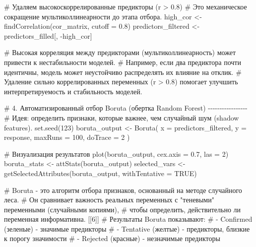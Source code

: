 \documentclass[
  letterpaper,
  DIV=11,
  numbers=noendperiod]{scrreprt}
\newenvironment{Shaded}{\begin{snugshade}}{\end{snugshade}}
\newcommand{\AttributeTok}[1]{\textcolor[rgb]{0.40,0.45,0.13}{#1}}
\newcommand{\CommentTok}[1]{\textcolor[rgb]{0.37,0.37,0.37}{#1}}
\newcommand{\ConstantTok}[1]{\textcolor[rgb]{0.56,0.35,0.01}{#1}}
\newcommand{\DecValTok}[1]{\textcolor[rgb]{0.68,0.00,0.00}{#1}}
\newcommand{\FloatTok}[1]{\textcolor[rgb]{0.68,0.00,0.00}{#1}}
\newcommand{\FunctionTok}[1]{\textcolor[rgb]{0.28,0.35,0.67}{#1}}
\newcommand{\NormalTok}[1]{\textcolor[rgb]{0.00,0.23,0.31}{#1}}
\newcommand{\OtherTok}[1]{\textcolor[rgb]{0.00,0.23,0.31}{#1}}
\newcommand{\SpecialCharTok}[1]{\textcolor[rgb]{0.37,0.37,0.37}{#1}}
\begin{document}
\begin{Shaded}
\begin{Highlighting}[]
\CommentTok{\# Удаляем высокоскоррелированные предикторы (r \textgreater{} 0.8)}
\CommentTok{\# Это механическое сокращение мультиколлинеарности до этапа отбора.}
\NormalTok{high\_cor }\OtherTok{\textless{}{-}} \FunctionTok{findCorrelation}\NormalTok{(cor\_matrix, }\AttributeTok{cutoff =} \FloatTok{0.8}\NormalTok{)}
\NormalTok{predictors\_filtered }\OtherTok{\textless{}{-}}\NormalTok{ predictors\_filled[, }\SpecialCharTok{{-}}\NormalTok{high\_cor]}

\CommentTok{\# Высокая корреляция между предикторами (мультиколлинеарность) может привести к нестабильности моделей.}
\CommentTok{\# Например, если два предиктора почти идентичны, модель может неустойчиво распределять их влияние на отклик.}
\CommentTok{\# Удаление сильно коррелированных переменных (r \textgreater{} 0.8) помогает улучшить интерпретируемость и стабильность моделей.}


\CommentTok{\# 4. Автоматизированный отбор Boruta (обертка Random Forest) {-}{-}{-}{-}{-}{-}{-}{-}{-}{-}{-}{-}{-}{-}{-}{-}{-}}
\CommentTok{\# Идея: определить признаки, которые важнее, чем случайный шум (shadow features).}
\FunctionTok{set.seed}\NormalTok{(}\DecValTok{123}\NormalTok{)}
\NormalTok{boruta\_output }\OtherTok{\textless{}{-}} \FunctionTok{Boruta}\NormalTok{(}
  \AttributeTok{x =}\NormalTok{ predictors\_filtered, }
  \AttributeTok{y =}\NormalTok{ response,}
  \AttributeTok{maxRuns =} \DecValTok{100}\NormalTok{,}
  \AttributeTok{doTrace =} \DecValTok{2}
\NormalTok{)}

\CommentTok{\# Визуализация результатов}
\FunctionTok{plot}\NormalTok{(boruta\_output, }\AttributeTok{cex.axis =} \FloatTok{0.7}\NormalTok{, }\AttributeTok{las =} \DecValTok{2}\NormalTok{)}
\NormalTok{boruta\_stats }\OtherTok{\textless{}{-}} \FunctionTok{attStats}\NormalTok{(boruta\_output)}
\NormalTok{selected\_vars }\OtherTok{\textless{}{-}} \FunctionTok{getSelectedAttributes}\NormalTok{(boruta\_output, }\AttributeTok{withTentative =} \ConstantTok{TRUE}\NormalTok{)}

\CommentTok{\# Boruta {-} это алгоритм отбора признаков, основанный на методе случайного леса.}
\CommentTok{\# Он сравнивает важность реальных переменных с "теневыми" переменными (случайными копиями),}
\CommentTok{\# чтобы определить, действительно ли переменная информативна. [[6]]}
\CommentTok{\# Результаты Boruta показывают: }
\CommentTok{\#   {-} Confirmed (зеленые) {-} значимые предикторы}
\CommentTok{\#   {-} Tentative (желтые) {-} предикторы, близкие к порогу значимости}
\CommentTok{\#   {-} Rejected (красные) {-} незначимые предикторы}



\end{Highlighting}
\end{Shaded}
\end{document}
